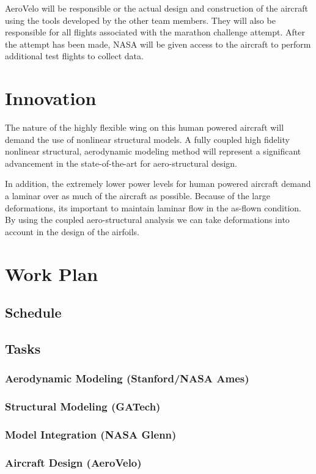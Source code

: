 \documentclass[]{aiaa-tc}
\begin{document}
    AeroVelo will be responsible or the actual design and construction of the aircraft using the tools developed 
    by the other team members. They will also be responsible for all flights associated with 
    the marathon challenge attempt. After the attempt has been made, NASA will be given access to 
    the aircraft to perform additional test flights to collect data. 


  \section{Innovation}
    The nature of the highly flexible wing on this human powered aircraft will demand the use 
    of nonlinear structural models. A fully coupled high fidelity nonlinear structural, aerodynamic modeling method 
    will represent a significant advancement in the state­-of-­the-­art for aero­-structural design. 

    In addition, the extremely lower power levels for human powered aircraft demand a laminar over as much of 
    the aircraft as possible. Because of the large deformations, its important to maintain laminar flow in the 
    as-flown condition. By using the coupled aero-structural analysis we can take deformations into account in the design 
    of the airfoils. 

  \section{Work Plan}
    \subsection{Schedule}
    \subsection{Tasks}
        \subsubsection{Aerodynamic Modeling (Stanford/NASA Ames)}
        \subsubsection{Structural Modeling (GATech)}
        \subsubsection{Model Integration (NASA Glenn)}
        \subsubsection{Aircraft Design (AeroVelo)}
\end{document}
